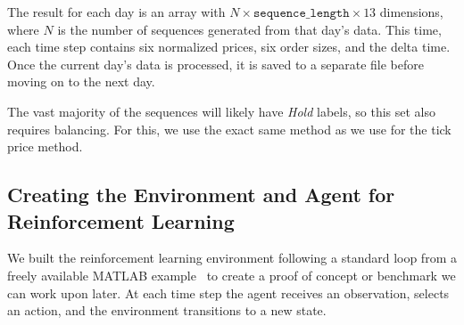 \documentclass[a4paper,oneside,onecolumn,12pt]{book}
\begin{document}
		The result for each day is an array with $N \times \texttt{sequence\_length} \times 13$ dimensions, where $N$ is the number of sequences generated from that day's data. This time, each time step contains six normalized prices, six order sizes, and the delta time. Once the current day's data is processed, it is saved to a separate file before moving on to the next day.

		The vast majority of the sequences will likely have \textit{Hold} labels, so this set also requires balancing. For this, we use the exact same method as we use for the tick price method.

	\subsection{Creating the Environment and Agent for Reinforcement Learning}
	We built the reinforcement learning environment following a standard loop from a freely available MATLAB example~\cite{DRLOTE} to create a proof of concept or benchmark we can work upon later. At each time step the agent receives an observation, selects an action, and the environment transitions to a new state.
\end{document}
